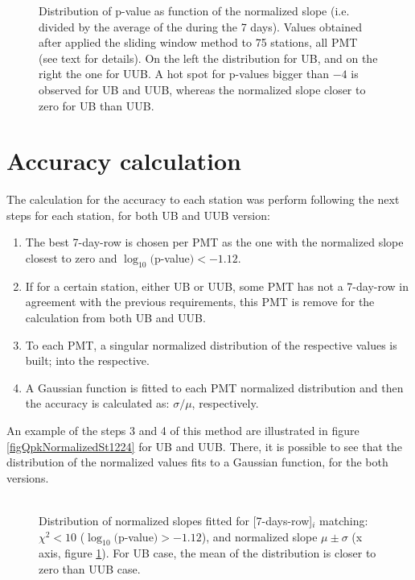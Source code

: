 \documentclass[twoside, final, 10pt]{articleMine}
\begin{document}
\begin{figure}[!t]
  \label{figLogPvalVsSlop}
  \centering
  \caption{Distribution of p-value as function of the normalized
  slope (i.e. divided by the average of the \qpkvem during the 7
  days). Values obtained after applied the sliding window method
  to 75 stations, all PMT (see text for details). On the left the
  distribution for UB, and on the right the one for UUB. A hot
  spot for p-values bigger than $-4$ is observed for UB and UUB,
  whereas the normalized slope closer to zero for UB than UUB.}
  \label{figLogPvalVsSlop}
\end{figure}
\section{Accuracy calculation}

The calculation for the \qpkvem accuracy to each station was
perform following the next steps for each station, for both UB
and UUB version:
\begin{enumerate}
  \item The best 7-day-row is chosen per PMT as the one with the
    normalized slope closest to zero and
    $\log_{10}($p-value$)<-1.12$.
  \item If for a certain station, either UB or UUB, some PMT has
    not a 7-day-row in agreement with the previous requirements,
    this PMT is remove for the calculation from both UB and UUB.
  \item To each PMT, a singular normalized distribution of the
    respective \qpkvem values is built; into the respective.
  \item A Gaussian function is fitted to each PMT normalized
    distribution and then the accuracy is calculated as:
    $\sigma/\mu$, respectively.
\end{enumerate}
An example of the steps 3 and 4 of this method are illustrated
in figure \ref{figQpkNormalizedSt1224} for UB and UUB. There, it
is possible to see that the distribution of the normalized
\qpkvem values fits to a Gaussian function, for the both
versions.\\\\
\clearpage


\begin{figure}[!t]
  \label{figProjSlop}
  \centering
  \caption{Distribution of normalized slopes fitted for
  [7-days-row]$_i$ matching: $\chi^2<10$
  ($\log_{10}($p-value$)>-1.12$), and normalized slope
  $\mu\pm\sigma$ (x axis, figure  \ref{figLogPvalVsSlop}). For UB
  case, the mean of the distribution is closer to zero than UUB
  case.}
  \label{figProjSlop}
\end{figure}
\end{document}
